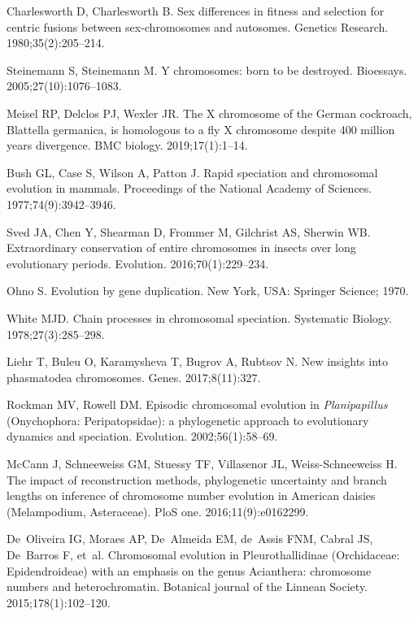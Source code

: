 \documentclass[]{rsos}%
\begin{document}
\begin{thebibliography}{9}
Charlesworth D, Charlesworth B.
 Sex differences in fitness and selection for centric fusions between
  sex-chromosomes and autosomes.
 Genetics Research. 1980;35(2):205--214.

Steinemann S, Steinemann M.
 Y chromosomes: born to be destroyed.
 Bioessays. 2005;27(10):1076--1083.

Meisel RP, Delclos PJ, Wexler JR.
 The X chromosome of the German cockroach, Blattella germanica, is
  homologous to a fly X chromosome despite 400 million years divergence.
 BMC biology. 2019;17(1):1--14.

Bush GL, Case S, Wilson A, Patton J.
 Rapid speciation and chromosomal evolution in mammals.
 Proceedings of the National Academy of Sciences.
  1977;74(9):3942--3946.

Sved JA, Chen Y, Shearman D, Frommer M, Gilchrist AS, Sherwin WB.
 Extraordinary conservation of entire chromosomes in insects over long
  evolutionary periods.
 Evolution. 2016;70(1):229--234.

Ohno S.
 Evolution by gene duplication.
 New York, USA: Springer Science; 1970.

White MJD.
 Chain processes in chromosomal speciation.
 Systematic Biology. 1978;27(3):285--298.
 
Liehr T, Buleu O, Karamysheva T, Bugrov A, Rubtsov N.
 New insights into phasmatodea chromosomes.
Genes. 2017;8(11):327.

Rockman MV, Rowell DM.
 Episodic chromosomal evolution in \emph{{P}lanipapillus}
  ({O}nychophora: {P}eripatopsidae): a phylogenetic approach to evolutionary
  dynamics and speciation.
 Evolution. 2002;56(1):58--69.

McCann J, Schneeweiss GM, Stuessy TF, Villasenor JL, Weiss-Schneeweiss H.
 The impact of reconstruction methods, phylogenetic uncertainty and
  branch lengths on inference of chromosome number evolution in American
  daisies (Melampodium, Asteraceae).
 PloS one. 2016;11(9):e0162299.

De~Oliveira IG, Moraes AP, De~Almeida EM, de~Assis FNM, Cabral JS, De~Barros F,
  et~al.
 Chromosomal evolution in Pleurothallidinae (Orchidaceae:
  Epidendroideae) with an emphasis on the genus Acianthera: chromosome numbers
  and heterochromatin.
 Botanical journal of the Linnean Society. 2015;178(1):102--120.


\end{thebibliography}
\end{document}
